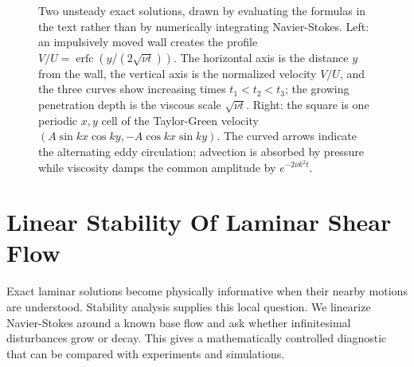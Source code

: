 \begin{figure}[htbp]
\caption{Two unsteady exact solutions, drawn by evaluating the formulas in the
text rather than by numerically integrating Navier-Stokes.  Left: an
impulsively moved wall creates the profile
\(V/U=\operatorname{erfc}(y/(2\sqrt{\nu t}))\).  The horizontal axis is the
distance \(y\) from the wall, the vertical axis is the normalized velocity
\(V/U\), and the three curves show increasing times \(t_1<t_2<t_3\); the growing
penetration depth is the viscous scale \(\sqrt{\nu t}\).  Right: the square is
one periodic \(x,y\) cell of the Taylor-Green velocity
\((A\sin kx\cos ky,-A\cos kx\sin ky)\).  The curved arrows indicate the
alternating eddy circulation; advection is absorbed by pressure while viscosity
damps the common amplitude by \(e^{-2\nu k^2t}\).}
\label{fig:unsteady-ns-exact-solutions}
\end{figure}

\section{Linear Stability Of Laminar Shear Flow}
\label{sec:linear-stability-shear}

Exact laminar solutions become physically informative when their nearby motions
are understood. Stability analysis supplies this local question. We linearize
Navier-Stokes around a known base flow and ask whether infinitesimal
disturbances grow or decay. This gives a mathematically controlled diagnostic
that can be compared with experiments and simulations.

